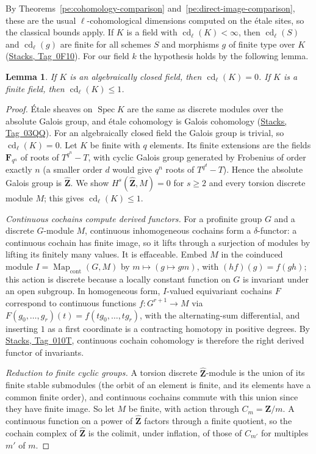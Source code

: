 \documentclass[11pt,a4paper]{article}
\numberwithin{equation}{section}
\newtheorem{lemma}[theorem]{Lemma}
\theoremstyle{definition}
\theoremstyle{remark}
\newcommand{\stacks}[1]{\href{https://stacks.math.columbia.edu/tag/#1}{\textnormal{Stacks, Tag~#1}}}
\begin{document}
By Theorems~\ref{pe:cohomology-comparison} and~\ref{pe:direct-image-comparison},
these are the usual $\ell$-cohomological dimensions computed on the
\'etale sites, so the classical bounds apply. If $K$ is a field with $\operatorname{cd}_\ell(K)<\infty$, then
$\operatorname{cd}_\ell(S)$ and $\operatorname{cd}_\ell(g)$ are finite for all
schemes $S$ and morphisms $g$ of finite type over $K$ (\stacks{0F10}).
For our field $k$ the hypothesis holds by the following lemma.

\begin{lemma}\label{b:lem:base-field-cd}
If $K$ is an algebraically closed field, then $\operatorname{cd}_\ell(K)=0$.
If $K$ is a finite field, then $\operatorname{cd}_\ell(K)\le1$.
\end{lemma}
\begin{proof}
\'Etale sheaves on $\operatorname{Spec}K$ are the same as discrete
modules over the absolute Galois group, and \'etale cohomology is Galois
cohomology (\stacks{03QQ}). For an algebraically closed field the Galois
group is trivial, so $\operatorname{cd}_\ell(K)=0$. Let $K$ be finite with $q$ elements. Its finite extensions are the
fields $\mathbf F_{q^n}$ of roots of $T^{q^n}-T$, with cyclic Galois group
generated by Frobenius of order exactly $n$ (a smaller order $d$ would
give $q^n$ roots of $T^{q^d}-T$). Hence the absolute Galois group is
$\widehat{\mathbf Z}$. We show $H^s(\widehat{\mathbf Z},M)=0$ for $s\geq2$
and every torsion discrete module $M$; this gives $\operatorname{cd}_\ell(K)\le1$.

\emph{Continuous cochains compute derived functors.} For a profinite
group $G$ and a discrete $G$-module $M$, continuous inhomogeneous
cochains form a $\delta$-functor: a continuous cochain has finite image,
so it lifts through a surjection of modules by lifting its finitely many
values. It is effaceable. Embed $M$ in the coinduced module
$I=\operatorname{Map}_{\mathrm{cont}}(G,M)$ by $m\mapsto(g\mapsto gm)$, with
$(hf)(g)=f(gh)$; this action is discrete because a locally constant
function on $G$ is invariant under an open subgroup. In homogeneous form,
$I$-valued equivariant cochains $F$ correspond to continuous functions
$f:G^{r+1}\to M$ via $F(g_0,\ldots,g_r)(t)=f(tg_0,\ldots,tg_r)$, with the
alternating-sum differential, and inserting $1$ as a first coordinate is
a contracting homotopy in positive degrees. By \stacks{010T}, continuous
cochain cohomology is therefore the right derived functor of invariants.

\emph{Reduction to finite cyclic groups.} A torsion discrete
$\widehat{\mathbf Z}$-module is the union of its finite stable submodules
(the orbit of an element is finite, and its elements have a common
finite order), and continuous cochains commute with this union since they
have finite image. So let $M$ be finite, with action through
$C_m=\mathbf Z/m$. A continuous function on a power of $\widehat{\mathbf Z}$
factors through a finite quotient, so the cochain complex of
$\widehat{\mathbf Z}$ is the colimit, under inflation, of those of
$C_{m'}$ for multiples $m'$ of $m$.


\end{proof}
\end{document}
